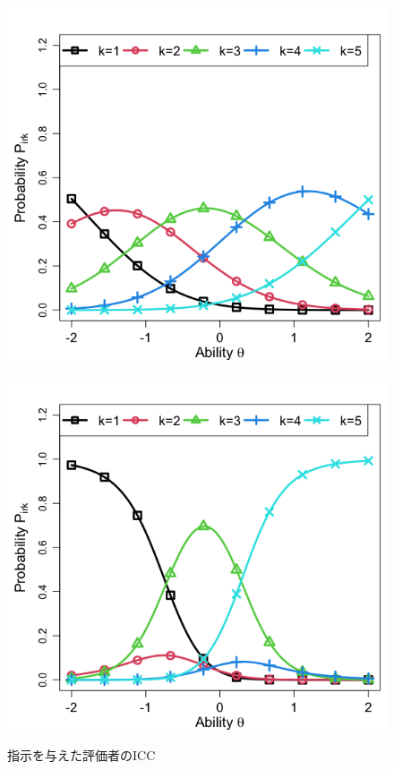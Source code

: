 \documentclass[a4paper,11pt,oneside,openany]{jsbook}
\begin{document}
\begin{figure}[tb]
\centering
 \begin{minipage}[b]{0.4\linewidth}
  \centering
  \includegraphics[keepaspectratio,scale=0.25]{img/ICC_r14.png}
  \label{D}
 \end{minipage}
 \begin{minipage}[b]{0.4\linewidth}
  \centering
  \includegraphics[keepaspectratio,scale=0.25]{img/ICC_r15.png}
  \label{E}
 \end{minipage}
 \caption{指示を与えた評価者のICC}\label{ICC_DE}
\end{figure}
\end{document}
